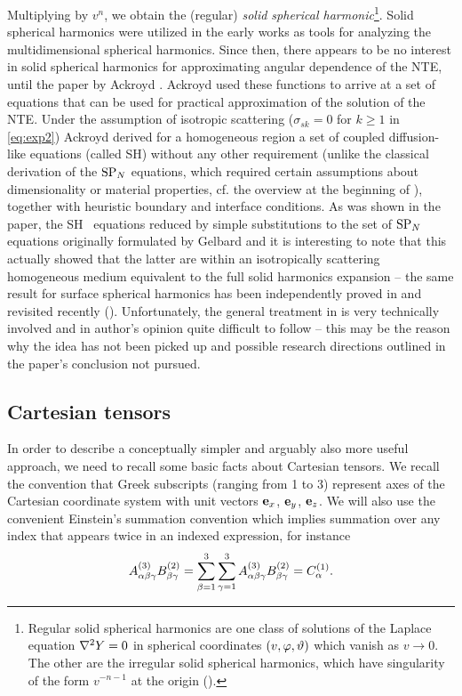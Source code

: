 Multiplying by $v^n$, we obtain the (regular) \textit{solid spherical harmonic}\footnote{Regular solid spherical
harmonics are one class of solutions of the Laplace equation \mbox{$\lap Y = 0$} in spherical coordinates
$(v,\azimuthal,\polar)$ which vanish as $v\to 0$. The other are the irregular solid spherical harmonics, which have
singularity of the form $v^{-n-1}$ at the origin (\cite[Chap. VI]{Byerly}).}. Solid spherical harmonics were utilized
in the early works \cite{Davison, Rumyantsev} as tools for analyzing the multidimensional spherical harmonics. Since
then, there appears to be no interest in solid spherical harmonics for approximating angular dependence of the NTE,
until the paper by Ackroyd \cite{Ackroyd1}. Ackroyd used these functions to arrive at a set of equations that can be
used for practical approximation of the solution of the NTE. Under the assumption of
isotropic scattering ($\sigma_{sk} = 0$ for $k \geq 1$ in \eqref{eq:exp2}) Ackroyd derived for a homogeneous region a set of coupled diffusion-like equations (called SH\PN) without any other
requirement (unlike the classical derivation of the $\SPN$ equations, which required certain assumptions about 
dimensionality or material properties, cf. the overview at the beginning of ),
together with heuristic boundary and interface conditions. As was shown in the paper, the SH\PN~ equations reduced by simple substitutions to the set of 
$\SPN$ equations originally formulated by Gelbard and it is interesting to note that this actually showed that the 
latter are within an isotropically scattering homogeneous medium equivalent to the full solid harmonics expansion -- 
the same result for surface spherical harmonics has been independently proved in \cite{Coppa1} and revisited recently 
(\cite{Coppa2,McClarren1}). Unfortunately, the general treatment in \cite{Ackroyd1} is very technically involved and in 
author's opinion quite difficult to follow -- this may be the reason why the idea has not been picked up and possible 
research directions outlined in the paper's conclusion not pursued.

\subsection{Cartesian tensors}\label{sec:tensors}
In order to describe a conceptually simpler and arguably also more useful approach, we need to recall some basic facts
about Cartesian tensors. We recall the convention that Greek subscripts (ranging from 1 to 3) represent axes of the
Cartesian coordinate system with unit vectors $\be_x$, $\be_y$, $\be_z$. We will also use the convenient Einstein's
summation convention which implies summation over any index that appears twice in an indexed expression, for instance $$
  \AAA[3]{\alpha\beta\gamma}\BBB[2]{\beta\gamma} =
  \suma[\beta]{1}{3}\suma[\gamma]{1}{3}\AAA[3]{\alpha\beta\gamma}\BBB[2]{\beta\gamma} = \CCC[1]{\alpha}.
$$

